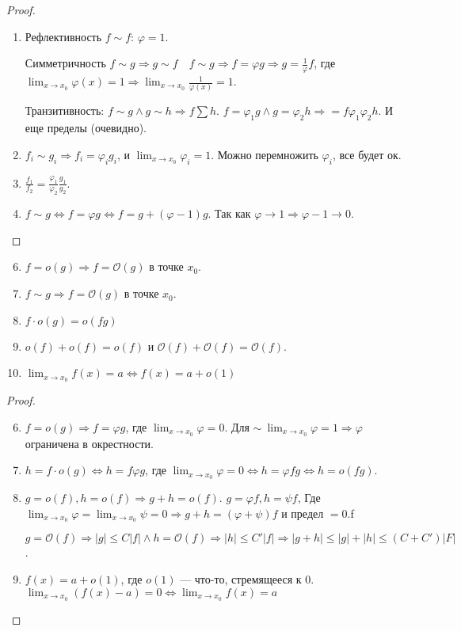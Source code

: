 \begin{proof}
    \begin{enumerate}
        \item Рефлективность $f \sim f$:  $\varphi = 1$.

            Симметричность $f \sim g \Rightarrow g \sim f \quad f \sim g \Rightarrow f = \varphi g \Rightarrow g = \frac{1}{\varphi} f$, где $\lim_{x \to x_0} \varphi(x) = 1 \Rightarrow \lim_{x \to x_0} \frac{1}{\varphi(x)} = 1$.

            Транзитивность: $f \sim g \land g \sim h \Rightarrow f \sum h$.  $f = \varphi_1 g \land g = \varphi_2 h \Rightarrow = f \varphi_1 \varphi_2 h$. И еще пределы (очевидно).
        \item $f_i \sim g_i \Rightarrow f_i = \varphi_i g_i$, и  $\lim_{x \to x_0}\varphi_i = 1$. Можно перемножить  $\varphi_i$, все будет ок.
        \item  $\frac{f_1}{f_2} = \frac{\varphi_1}{\varphi_2} \frac{g_1}{g_2}$.
        \item $f \sim g \iff f = \varphi g \iff f = g + (\varphi  - 1) g$. Так как  $\varphi \to 1 \Rightarrow \varphi - 1 \to 0$.
    \end{enumerate}
\end{proof}
\begin{properties}
   \begin{enumerate}
       \setcounter{enumi}{5}
   \item $f = o(g) \Rightarrow f = \mathcal{O}(g)$ в точке  $x_0$.
   \item $f \sim g \Rightarrow f = \mathcal{O}(g)$ в точке $x_0$.
   \item  $f \cdot o(g) = o(fg)$
   \item  $o(f) + o(f) = o(f)$ и  $\mathcal{O}(f) + \mathcal{O}(f) = \mathcal{O}(f)$.
   \item $\lim_{x\to x_0} f(x) = a \iff f(x) = a + o(1)$
   \end{enumerate} 
\end{properties}
\begin{proof}
    \begin{enumerate}
        \setcounter{enumi}{5}
    \item $f = o(g) \Rightarrow f = \varphi g$, где  $\lim_{x \to x_0} \varphi = 0.$
        Для $\sim\ \lim_{x \to x_0} \varphi = 1 \Rightarrow \varphi$ ограничена в окрестности.
    \item $h = f \cdot o(g) \iff h = f \varphi g$, где  $\lim_{x \to x_0} \varphi = 0 \iff h = \varphi f g \iff h = o(fg)$.
    \item  $g = o(f), h = o(f) \Rightarrow g + h = o(f)$.  $g = \varphi f, h = \psi f$, Где  $\lim_{x \to x_0} \varphi = \lim_{x \to x_0} \psi = 0 \Rightarrow g+h = (\varphi + \psi)f$ и предел $=0$.f

        $g = \mathcal{O}(f) \Rightarrow |g| \le C|f| \land h = \mathcal{O}(f) \Rightarrow |h| \le C'|f| \Rightarrow |g+h| \le |g| + |h| \le (C + C') |F|$.
    \item $f(x) = a + o(1)$, где  $o(1)$ --- что-то, стремящееся к 0.  $\lim_{x \to x_0} (f(x) - a) = 0 \iff \lim_{x \to x_0} f(x) = a$
    \end{enumerate}
\end{proof}
